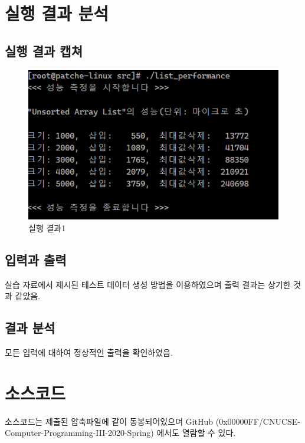 \documentclass[UTF8, a4paper]{report}
\begin{document}
    \chapter{실행 결과 분석}
        \section{실행 결과 캡쳐}
        \begin{figure}[!htb]
            \centering
            \includegraphics[width=\textwidth]{result.PNG}
            \caption{실행 결과1}
        \end{figure}
        
        \newpage

        \section{입력과 출력}
            실습 자료에서 제시된 테스트 데이터 생성 방법을 이용하였으며 출력 결과는 상기한 것과 같았음.
        \section{결과 분석}
            모든 입력에 대하여 정상적인 출력을 확인하였음.

    \chapter{소스코드}
        소스코드는 제출된 압축파일에 같이 동봉되어있으며 GitHub (0x00000FF/CNUCSE-Computer-Programming-III-2020-Spring) 에서도 열람할 수 있다.
\end{document}

